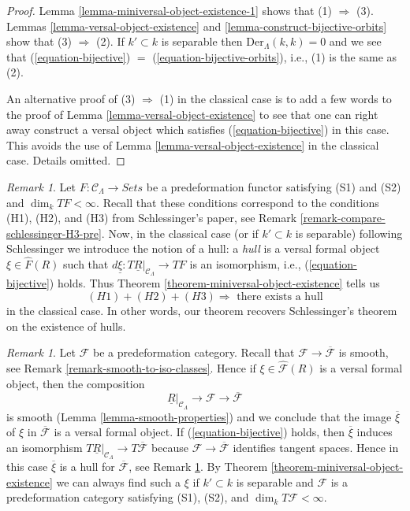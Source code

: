 \documentclass{stacks-project}
\theoremstyle{plain}
\theoremstyle{definition}
\theoremstyle{remark}
\newtheorem{remark}[subsection]{Remark}
\numberwithin{equation}{subsection}
\begin{document}
\begin{proof}
Lemma \ref{lemma-miniversal-object-existence-1}
shows that (1) $\Rightarrow$ (3).
Lemmas \ref{lemma-versal-object-existence} and
\ref{lemma-construct-bijective-orbits}
show that (3) $\Rightarrow$ (2). If $k' \subset k$ is separable
then $\text{Der}_\Lambda(k, k) = 0$ and we see that
(\ref{equation-bijective}) $=$ (\ref{equation-bijective-orbits}), i.e.,
(1) is the same as (2).

\medskip\noindent
An alternative proof of (3) $\Rightarrow$ (1) in the classical case
is to add a few words to the proof of
Lemma \ref{lemma-versal-object-existence}
to see that one can right away construct a versal object which
satisfies (\ref{equation-bijective}) in this case. This avoids the use of
Lemma \ref{lemma-versal-object-existence}
in the classical case. Details omitted.
\end{proof}

\begin{remark}
\label{remark-compare-schlessinger-H3}
Let $F : \mathcal{C}_\Lambda \to \textit{Sets}$ be a predeformation functor
satisfying (S1) and (S2) and $\dim_k TF < \infty$.
Recall that these conditions correspond to the conditions
(H1), (H2), and (H3) from Schlessinger's paper, see
Remark \ref{remark-compare-schlessinger-H3-pre}.
Now, in the classical case (or if $k' \subset k$ is separable)
following Schlessinger we introduce the notion of a hull: a {\it hull}
is a versal formal object $\xi \in \widehat{F}(R)$ such that
$d\underline{\xi} : T\underline{R}|_{\mathcal{C}_\Lambda} \to TF$
is an isomorphism, i.e., (\ref{equation-bijective}) holds.
Thus Theorem \ref{theorem-miniversal-object-existence} tells us
$$
(H1) + (H2) + (H3)
\Rightarrow
\text{ there exists a hull}
$$
in the classical case. In other words, our theorem
recovers Schlessinger's theorem on the existence of hulls.
\end{remark}

\begin{remark}
\label{remark-compose-minimal-into-iso-classes}
Let $\mathcal{F}$ be a predeformation category. Recall that
$\mathcal{F} \to \overline{\mathcal{F}}$ is smooth, see
Remark \ref{remark-smooth-to-iso-classes}. Hence if
$\xi \in \widehat{\mathcal{F}}(R)$ is a versal formal object,
then the composition
$$
\underline{R}|_{\mathcal{C}_\Lambda} \longrightarrow
\mathcal{F} \longrightarrow \overline{\mathcal{F}}
$$
is smooth (Lemma \ref{lemma-smooth-properties}) and we conclude
that the image $\overline{\xi}$ of $\xi$ in
$\overline{\mathcal{F}}$ is a versal formal object.
If (\ref{equation-bijective}) holds, then $\overline{\xi}$
induces an isomorphism
$T\underline{R}|_{\mathcal{C}_\Lambda} \to T\overline{\mathcal{F}}$
because $\mathcal{F} \to \overline{\mathcal{F}}$ identifies tangent spaces.
Hence in this case $\overline{\xi}$
is a hull for $\overline{\mathcal{F}}$, see
Remark \ref{remark-compare-schlessinger-H3}.
By Theorem \ref{theorem-miniversal-object-existence}
we can always find such a $\xi$ if $k' \subset k$ is separable and
$\mathcal{F}$ is a predeformation category satisfying
(S1), (S2), and $\dim_k T\mathcal{F} < \infty$.
\end{remark}
\end{document}
